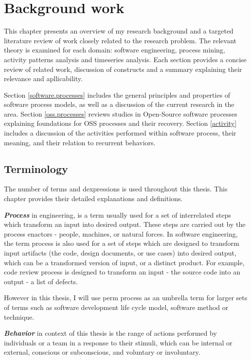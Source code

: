 \chapter{Background work}
This chapter presents an overview of my research background and a targeted literature 
review of work closely related to the research problem.
The relevant theory is examined for each domain: software engineering, process mining,
activity patterns analysis and timeseries analysis. Each section provides a concise review 
of related work, discussion of constructs and a summary explaining their relevance and 
apllicability. 

Section \ref{software.processes} includes the general principles and properties of 
software process models, as well as a discussion of the current research in the area.
Section \ref{oss.processes} reviews studies in Open-Source software processes
explaining foundations for OSS processes and their recovery.
Section \ref{activity} includes a discussion of the activities performed within software
process, their meaning, and their relation to recurrent behaviors.

\section{Terminology}\label{definitions}
The number of terms and dexpressions is used throughout this thesis. This chapter provides
their detailed explanations and definitions.

\textit{\textbf{Process}} in engineering, is a term usually used for a set of interrelated 
steps which transform an input into desired output. These steps are carried out by the process
enactors - people, machines, or natural forces. In software engineering, the term process is 
also used for a set of steps which are designed to transform input artifacts (the code, design
documents, or use cases) into desired output, which can be a transformed version of input, or a
distinct product. For example, code review process is designed to transform an input - the 
source code into an output - a list of defects.

However in this thesis, I will use perm process as an umbrella term for larger sets of terms
such as software development life cycle model, software method or technique. 

\textit{\textbf{Behavior}} in context of this thesis is the range of actions performed by 
individuals or a team in a response to their stimuli, which can be internal or external, 
conscious or subconscious, and voluntary or involuntary. 

